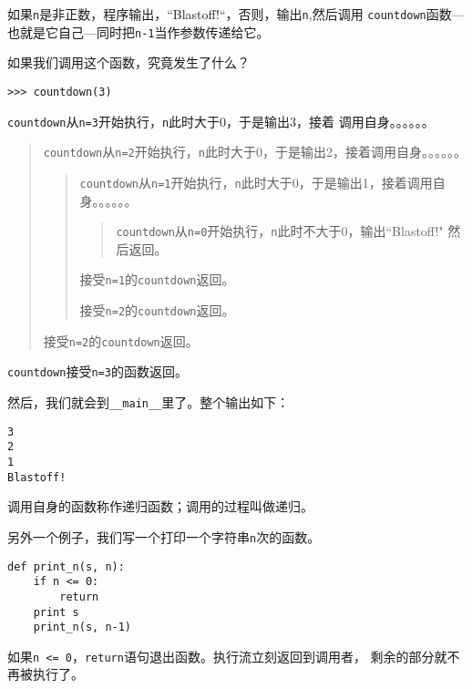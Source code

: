 {如果{\tt n}是非正数，程序输出，“Blastoff!“，否则，输出{\tt n},然后调用
{\tt countdown}函数---也就是它自己---同时把{\tt n-1}当作参数传递给它。

如果我们调用这个函数，究竟发生了什么？

\beforeverb
\begin{verbatim}
>>> countdown(3)
\end{verbatim}
\afterverb
%
{\tt countdown}从{\tt n=3}开始执行，{\tt n}此时大于0，于是输出3，接着
调用自身。。。。。。

\begin{quote}
{\tt countdown}从{\tt n=2}开始执行，{\tt n}此时大于0，于是输出2，接着调用自身。。。。。。

\begin{quote}
{\tt countdown}从{\tt n=1}开始执行，{\tt n}此时大于0，于是输出1，接着调用自身。。。。。。

\begin{quote}
{\tt countdown}从{\tt n=0}开始执行，{\tt n}此时不大于0，输出“Blastoff!"
然后返回。
\end{quote}

接受{\tt n=1}的{\tt countdown}返回。

接受{\tt n=2}的{\tt countdown}返回。
\end{quote}

接受{\tt n=2}的{\tt countdown}返回。
\end{quote}

{\tt countdown}接受{\tt n=3}的函数返回。

然后，我们就会到\verb"__main__"里了。整个输出如下：

\beforeverb
\begin{verbatim}
3
2
1
Blastoff!
\end{verbatim}
\afterverb

 调用自身的函数称作递归函数；调用的过程叫做递归。


另外一个例子，我们写一个打印一个字符串{\tt n}次的函数。

\beforeverb
\begin{verbatim}
def print_n(s, n):
    if n <= 0:
        return
    print s
    print_n(s, n-1)
\end{verbatim}
\afterverb

如果{\tt n <= 0}，{\tt return}语句退出函数。执行流立刻返回到调用者，
剩余的部分就不再被执行了。


}
